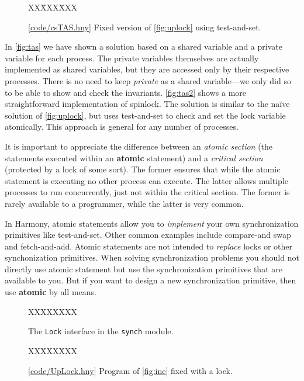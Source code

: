 \documentclass{report}
\newcommand{\harmonysource}[1]{
\begin{tabbing}
XX\=XXX\=XXX\kill
    
\end{tabbing}
}
\newcommand{\harmonylink}[1]{%
[\href{https://www.cs.cornell.edu/home/rvr/harmony/#1}{\underline{#1}}]%
}
\newenvironment{code}{
\tcolorbox
}{
\endtcolorbox
}
\begin{document}
\begin{figure}
\begin{code}
\harmonysource{csTAS}
\end{code}
\caption{\harmonylink{code/csTAS.hny} Fixed version of \autoref{fig:uplock} using test-and-set.}
\label{fig:tas2}
\end{figure}

In \autoref{fig:tas} we have shown a solution based on a shared
variable and a private variable for each process.   The private
variables themselves are actually implemented as shared variables,
but they are accessed only by their respective processes.
There is no need to keep \textit{private} as a shared
variable---we only did so to be able to show and check the invariants.
\autoref{fig:tas2} shows a more straightforward implementation of spinlock.
The solution is similar to the na\"{i}ve solution of \autoref{fig:uplock},
but uses test-and-set to check and set the lock variable atomically.
This approach is general for any number of processes.

It is important to appreciate the difference between an
\emph{atomic section} (the statements executed within an
\textbf{atomic} statement) and a \emph{critical section}
(protected by a lock of some sort).
The former ensures that while the
atomic statement is executing no other process can execute.
The latter allows multiple processes to run concurrently,
just not within the critical section.
The former is rarely available to a programmer, while the latter
is very common.

In Harmony, atomic statements allow you to \emph{implement} your own
synchronization primitives like test-and-set.  Other common examples
include compare-and swap and fetch-and-add.  Atomic statements
are not intended to \emph{replace} locks or other synchonization primitives.
When solving synchronization problems you should not directly use
atomic statement but use the synchronization primitives that are available
to you.  But if you want to design a new synchronization primitive, then
use \textbf{atomic} by all means.

\begin{figure}
\begin{code}
\harmonysource{lockintf}
\end{code}
\caption{The \texttt{Lock} interface in the \texttt{synch} module.}
\label{fig:spinlocks}
\end{figure}

\begin{figure}
\begin{code}
\harmonysource{UpLock}
\end{code}
\caption{\harmonylink{code/UpLock.hny} Program of \autoref{fig:inc} fixed with a lock.}
\label{fig:incfixed}
\end{figure}
\end{document}
